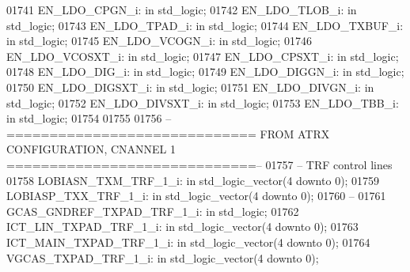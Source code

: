 \begin{DoxyCode}
01741     EN\_LDO\_CPGN\_i:  \textcolor{keywordflow}{in} \textcolor{comment}{std\_logic};
01742     EN\_LDO\_TLOB\_i:  \textcolor{keywordflow}{in} \textcolor{comment}{std\_logic};
01743     EN\_LDO\_TPAD\_i:  \textcolor{keywordflow}{in} \textcolor{comment}{std\_logic};
01744     EN\_LDO\_TXBUF\_i: \textcolor{keywordflow}{in} \textcolor{comment}{std\_logic};
01745     EN\_LDO\_VCOGN\_i: \textcolor{keywordflow}{in} \textcolor{comment}{std\_logic};
01746     EN\_LDO\_VCOSXT\_i:    \textcolor{keywordflow}{in} \textcolor{comment}{std\_logic};
01747     EN\_LDO\_CPSXT\_i: \textcolor{keywordflow}{in} \textcolor{comment}{std\_logic};
01748     EN\_LDO\_DIG\_i:   \textcolor{keywordflow}{in} \textcolor{comment}{std\_logic};
01749     EN\_LDO\_DIGGN\_i: \textcolor{keywordflow}{in} \textcolor{comment}{std\_logic};
01750     EN\_LDO\_DIGSXT\_i:    \textcolor{keywordflow}{in} \textcolor{comment}{std\_logic};
01751     EN\_LDO\_DIVGN\_i: \textcolor{keywordflow}{in} \textcolor{comment}{std\_logic};
01752     EN\_LDO\_DIVSXT\_i:    \textcolor{keywordflow}{in} \textcolor{comment}{std\_logic};
01753     EN\_LDO\_TBB\_i:   \textcolor{keywordflow}{in} \textcolor{comment}{std\_logic};
01754 
01755 
01756 \textcolor{keyword}{    --============================= FROM ATRX CONFIGURATION, CNANNEL 1 =============================--}
01757 \textcolor{keyword}{    -- TRF control lines}
01758     LOBIASN\_TXM\_TRF\_1\_i:    \textcolor{keywordflow}{in} \textcolor{comment}{std\_logic\_vector}(\textcolor{vhdllogic}{}\textcolor{vhdllogic}{4} \textcolor{keywordflow}{downto} \textcolor{vhdllogic}{}\textcolor{vhdllogic}{0});
01759     LOBIASP\_TXX\_TRF\_1\_i:    \textcolor{keywordflow}{in} \textcolor{comment}{std\_logic\_vector}(\textcolor{vhdllogic}{}\textcolor{vhdllogic}{4} \textcolor{keywordflow}{downto} \textcolor{vhdllogic}{}\textcolor{vhdllogic}{0});
01760 \textcolor{keyword}{    --}
01761     GCAS\_GNDREF\_TXPAD\_TRF\_1\_i:  \textcolor{keywordflow}{in} \textcolor{comment}{std\_logic};
01762     ICT\_LIN\_TXPAD\_TRF\_1\_i:  \textcolor{keywordflow}{in} \textcolor{comment}{std\_logic\_vector}(\textcolor{vhdllogic}{}\textcolor{vhdllogic}{4} \textcolor{keywordflow}{downto} \textcolor{vhdllogic}{}\textcolor{vhdllogic}{0});
01763     ICT\_MAIN\_TXPAD\_TRF\_1\_i: \textcolor{keywordflow}{in} \textcolor{comment}{std\_logic\_vector}(\textcolor{vhdllogic}{}\textcolor{vhdllogic}{4} \textcolor{keywordflow}{downto} \textcolor{vhdllogic}{}\textcolor{vhdllogic}{0});
01764     VGCAS\_TXPAD\_TRF\_1\_i:    \textcolor{keywordflow}{in} \textcolor{comment}{std\_logic\_vector}(\textcolor{vhdllogic}{}\textcolor{vhdllogic}{4} \textcolor{keywordflow}{downto} \textcolor{vhdllogic}{}\textcolor{vhdllogic}{0});

\end{DoxyCode}
